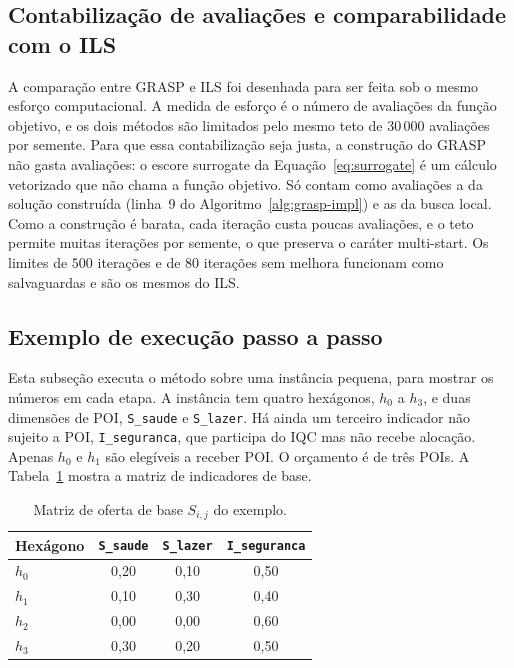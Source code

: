 \documentclass[11pt,a4paper]{article}
\newcommand{\code}[1]{\texttt{#1}}
\begin{document}
\subsection{Contabilização de avaliações e comparabilidade com o ILS}

A comparação entre GRASP e ILS foi desenhada para ser feita sob o mesmo esforço computacional. A medida de esforço é o número de avaliações da função objetivo, e os dois métodos são limitados pelo mesmo teto de $30\,000$ avaliações por semente. Para que essa contabilização seja justa, a construção do GRASP não gasta avaliações: o escore surrogate da Equação~\eqref{eq:surrogate} é um cálculo vetorizado que não chama a função objetivo. Só contam como avaliações a da solução construída (linha~9 do Algoritmo~\ref{alg:grasp-impl}) e as da busca local. Como a construção é barata, cada iteração custa poucas avaliações, e o teto permite muitas iterações por semente, o que preserva o caráter multi-start. Os limites de $500$ iterações e de $80$ iterações sem melhora funcionam como salvaguardas e são os mesmos do ILS.

\subsection{Exemplo de execução passo a passo}
\label{sec:exemplo}

Esta subseção executa o método sobre uma instância pequena, para mostrar os números em cada etapa. A instância tem quatro hexágonos, $h_0$ a $h_3$, e duas dimensões de POI, \code{S\_saude} e \code{S\_lazer}. Há ainda um terceiro indicador não sujeito a POI, \code{I\_seguranca}, que participa do IQC mas não recebe alocação. Apenas $h_0$ e $h_1$ são elegíveis a receber POI. O orçamento é de três POIs. A Tabela~\ref{tab:toy-base} mostra a matriz de indicadores de base.

\begin{table}[h]
\centering
\caption{Matriz de oferta de base $S_{i,j}$ do exemplo.}
\label{tab:toy-base}
\begin{tabular}{@{}lccc@{}}
\toprule
Hexágono & \code{S\_saude} & \code{S\_lazer} & \code{I\_seguranca} \\
\midrule
$h_0$ & 0,20 & 0,10 & 0,50 \\
$h_1$ & 0,10 & 0,30 & 0,40 \\
$h_2$ & 0,00 & 0,00 & 0,60 \\
$h_3$ & 0,30 & 0,20 & 0,50 \\
\bottomrule
\end{tabular}
\end{table}
\end{document}

